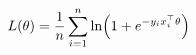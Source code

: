 \documentclass[preview]{standalone}
\begin{document}
\begin{align*}
\special{dvisvgm:raw <g id='unique000'>}L(\theta) = \frac{1}{n}\sum_{i=1}^{n}\ln\!\left(1 + e^{-y_i x_i^\top \theta}\right)\special{dvisvgm:raw </g>}
\end{align*}
\end{document}

